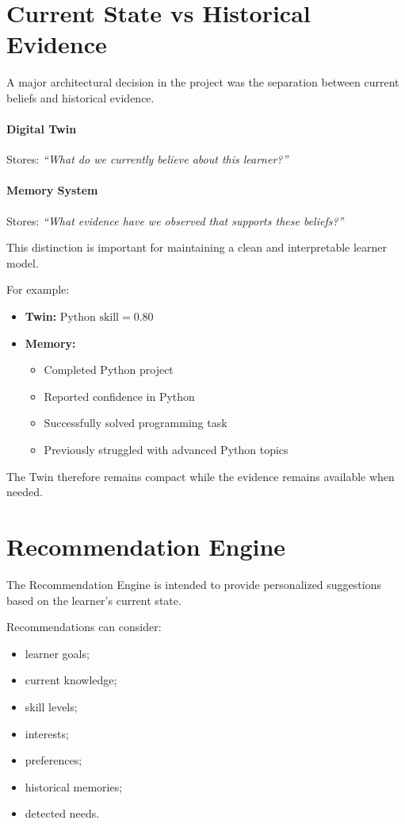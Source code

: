 \documentclass[12pt,a4paper]{article}
\begin{document}
\section{Current State vs Historical Evidence}
A major architectural decision in the project was the separation between current beliefs and historical evidence.

\paragraph{Digital Twin} Stores: \textit{``What do we currently believe about this learner?''}

\paragraph{Memory System} Stores: \textit{``What evidence have we observed that supports these beliefs?''}

This distinction is important for maintaining a clean and interpretable learner model.

For example:
\begin{itemize}[noitemsep,topsep=2pt]
    \item \textbf{Twin:} $\text{Python skill} = 0.80$
    \item \textbf{Memory:}
    \begin{itemize}[noitemsep,topsep=1pt]
        \item Completed Python project
        \item Reported confidence in Python
        \item Successfully solved programming task
        \item Previously struggled with advanced Python topics
    \end{itemize}
\end{itemize}

The Twin therefore remains compact while the evidence remains available when needed.

\section{Recommendation Engine}
The Recommendation Engine is intended to provide personalized suggestions based on the learner's current state.

Recommendations can consider:
\begin{itemize}[noitemsep,topsep=2pt]
    \item learner goals;
    \item current knowledge;
    \item skill levels;
    \item interests;
    \item preferences;
    \item historical memories;
    \item detected needs.
\end{itemize}
\end{document}
